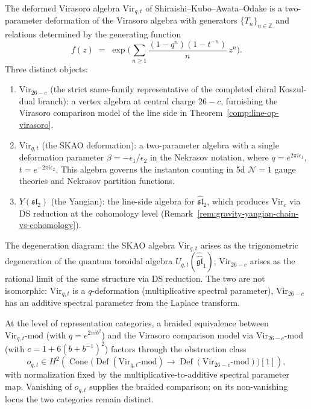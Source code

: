 \begin{remark}
\label{rem:virasoro-skao-comparison}
The deformed Virasoro algebra $\mathrm{Vir}_{q,t}$ of
Shiraishi--Kubo--Awata--Odake is a two-parameter deformation of the
Virasoro algebra with generators $\{T_n\}_{n \in \mathbb{Z}}$ and
relations determined by the generating function
\[
f(z)
\;=\;
\exp\!\Biggl(
\sum_{n \ge 1} \frac{(1-q^n)(1-t^{-n})}{n}\, z^n
\Biggr).
\]
Three distinct objects:
\begin{enumerate}[label=\textup{(\roman*)}]
\item $\mathrm{Vir}_{26-c}$ (the strict same-family representative
 of the completed chiral Koszul-dual branch):
 a vertex algebra at central charge $26-c$, furnishing
 the Virasoro comparison model of the line side in
 Theorem~\textup{\ref{comp:line-op-virasoro}}.
\item $\mathrm{Vir}_{q,t}$ (the SKAO deformation):
 a two-parameter algebra with a single deformation
 parameter $\beta = -\epsilon_1/\epsilon_2$ in the
 Nekrasov notation, where $q = e^{2\pi i \epsilon_1}$,
 $t = e^{-2\pi i \epsilon_2}$. This algebra governs
 the instanton counting in 5d $\mathcal{N}=1$ gauge
 theories and Nekrasov partition functions.
\item $Y(\mathfrak{sl}_2)$ (the Yangian):
 the line-side algebra for $\widehat{\mathfrak{sl}}_2$,
 which produces $\mathrm{Vir}_c$ via DS reduction
 at the cohomology level
 (Remark~\ref{rem:gravity-yangian-chain-vs-cohomology}).
\end{enumerate}

The degeneration diagram: the SKAO algebra $\mathrm{Vir}_{q,t}$
arises as the trigonometric degeneration of the quantum toroidal
algebra $U_{q,t}(\widehat{\widehat{\mathfrak{gl}}}_1)$;
$\mathrm{Vir}_{26-c}$ arises as the rational limit of the same
structure via DS reduction. The two are not isomorphic:
$\mathrm{Vir}_{q,t}$ is a $q$-deformation (multiplicative spectral
parameter), $\mathrm{Vir}_{26-c}$ has an additive spectral parameter
from the Laplace transform.

At the level of representation categories, a braided equivalence
between $\mathrm{Vir}_{q,t}\text{-mod}$ (with $q = e^{2\pi i b^2}$)
and the Virasoro comparison model via $\mathrm{Vir}_{26-c}\text{-mod}$
(with $c = 1 + 6(b+b^{-1})^2$) factors through the obstruction class
\[
 o_{q,t}\in
 H^2\!\left(
 \operatorname{Cone}\bigl(
 \operatorname{Def}(\mathrm{Vir}_{q,t}\text{-mod})
 \longrightarrow
 \operatorname{Def}(\mathrm{Vir}_{26-c}\text{-mod})
 \bigr)[1]\right),
\]
with normalization fixed by the multiplicative-to-additive spectral
parameter map. Vanishing of $o_{q,t}$ supplies the braided
comparison; on its non-vanishing locus the two categories remain
distinct.
\end{remark}

